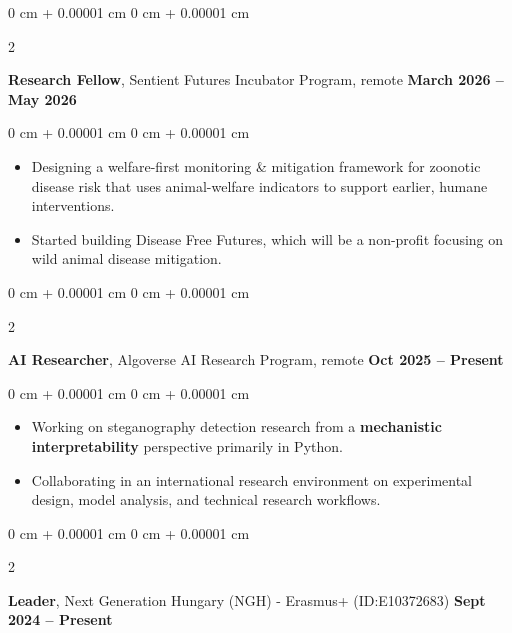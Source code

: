 \documentclass[10pt, letterpaper]{article}
\newenvironment{highlights}{
    \begin{itemize}[
        topsep=0.10 cm,
        parsep=0.10 cm,
        partopsep=0pt,
        itemsep=0pt,
        leftmargin=0 cm + 10pt
    ]
}{
    \end{itemize}
} %
\newenvironment{onecolentry}{
    \begin{adjustwidth}{
        0 cm + 0.00001 cm
    }{
        0 cm + 0.00001 cm
    }
}{
    \end{adjustwidth}
} %
\newenvironment{twocolentry}[2][]{
    \onecolentry
    \def\secondColumn{#2}
    \setcolumnwidth{\fill, 4.5 cm}
    \begin{paracol}{2}
}{
    \switchcolumn \raggedleft \secondColumn
    \end{paracol}
    \endonecolentry
} %
\begin{document}
        \vspace{0.2 cm}
    
        \begin{twocolentry}{
            \textbf{March 2026 – May 2026}
        }
            \textbf{Research Fellow}, Sentient Futures Incubator Program, remote\end{twocolentry}

        \vspace{0.10 cm}
        \begin{onecolentry}
            \begin{highlights}
                \item Designing a welfare-first monitoring \& mitigation framework for zoonotic disease risk that uses animal-welfare indicators to support earlier, humane interventions.
                \item Started building Disease Free Futures, which will be a non-profit focusing on wild animal disease mitigation.
            \end{highlights}
        \end{onecolentry}

        \vspace{0.2 cm}
    
        \begin{twocolentry}{
            \textbf{Oct 2025 – Present}
        }
            \textbf{AI Researcher}, Algoverse AI Research Program, remote\end{twocolentry}

        \vspace{0.10 cm}
        \begin{onecolentry}
            \begin{highlights}
                \item Working on steganography detection research from a \textbf{mechanistic interpretability} perspective primarily in Python.
                \item Collaborating in an international research environment on experimental design, model analysis, and technical research workflows.
            \end{highlights}
        \end{onecolentry}

        \vspace{0.2 cm}

        \begin{twocolentry}{
            \textbf{Sept 2024 – Present}
        }
            \textbf{Leader}, Next Generation Hungary (NGH) - Erasmus+ (ID:E10372683)\end{twocolentry}
\end{document}
